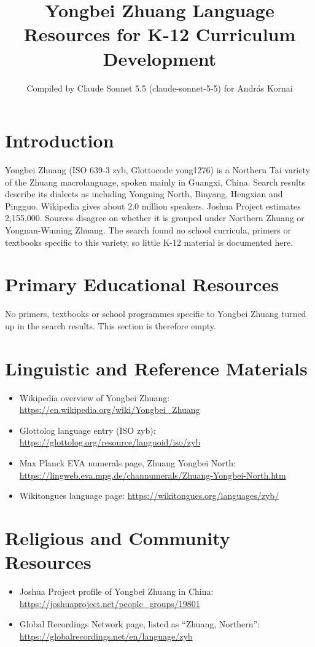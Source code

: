 \documentclass[12pt]{article}
\title{Yongbei Zhuang Language Resources for K-12 Curriculum Development}
\author{Compiled by Claude Sonnet 5.5 (claude-sonnet-5-5) for Andr\'as Kornai}
\date{}
\begin{document}
\maketitle

\section{Introduction}
Yongbei Zhuang (ISO 639-3 zyb, Glottocode yong1276) is a Northern Tai variety of the Zhuang macrolanguage, spoken mainly in Guangxi, China. Search results describe its dialects as including Yongning North, Binyang, Hengxian and Pingguo. Wikipedia gives about 2.0 million speakers. Joshua Project estimates 2,155,000. Sources disagree on whether it is grouped under Northern Zhuang or Yongnan-Wuming Zhuang. The search found no school curricula, primers or textbooks specific to this variety, so little K-12 material is documented here.

\section{Primary Educational Resources}
No primers, textbooks or school programmes specific to Yongbei Zhuang turned up in the search results. This section is therefore empty.

\section{Linguistic and Reference Materials}
\begin{itemize}
\item Wikipedia overview of Yongbei Zhuang: \url{https://en.wikipedia.org/wiki/Yongbei_Zhuang}
\item Glottolog language entry (ISO zyb): \url{https://glottolog.org/resource/languoid/iso/zyb}
\item Max Planck EVA numerals page, Zhuang Yongbei North: \url{https://lingweb.eva.mpg.de/channumerals/Zhuang-Yongbei-North.htm}
\item Wikitongues language page: \url{https://wikitongues.org/languages/zyb/}
\end{itemize}

\section{Religious and Community Resources}
\begin{itemize}
\item Joshua Project profile of Yongbei Zhuang in China: \url{https://joshuaproject.net/people_groups/19801}
\item Global Recordings Network page, listed as ``Zhuang, Northern'': \url{https://globalrecordings.net/en/language/zyb}
\end{itemize}
\end{document}
